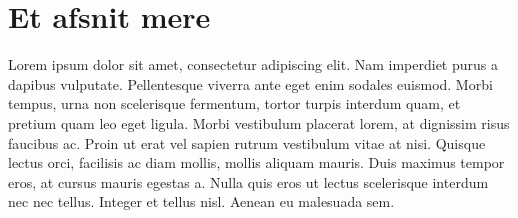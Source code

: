 
\section{Et afsnit mere}

Lorem ipsum dolor sit amet, consectetur adipiscing elit. Nam imperdiet purus a dapibus vulputate. Pellentesque viverra ante eget enim sodales euismod. Morbi tempus, urna non scelerisque fermentum, tortor turpis interdum quam, et pretium quam leo eget ligula. Morbi vestibulum placerat lorem, at dignissim risus faucibus ac. Proin ut erat vel sapien rutrum vestibulum vitae at nisi. Quisque lectus orci, facilisis ac diam mollis, mollis aliquam mauris. Duis maximus tempor eros, at cursus mauris egestas a. Nulla quis eros ut lectus scelerisque interdum nec nec tellus. Integer et tellus nisl. Aenean eu malesuada sem.